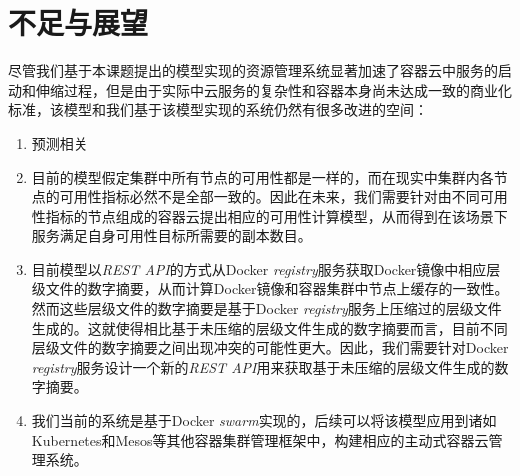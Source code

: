 \section{不足与展望}
尽管我们基于本课题提出的模型实现的资源管理系统显著加速了容器云中服务的启动和伸缩过程，但是由于实际中云服务的复杂性和容器本身尚未达成一致的商业化标准，该模型和我们基于该模型实现的系统仍然有很多改进的空间：
\begin{enumerate}
\item 预测相关
\item 目前的模型假定集群中所有节点的可用性都是一样的，而在现实中集群内各节点的可用性指标必然不是全部一致的。因此在未来，我们需要针对由不同可用性指标的节点组成的容器云提出相应的可用性计算模型，从而得到在该场景下服务满足自身可用性目标所需要的副本数目。
\item 目前模型以\emph{REST API}的方式从Docker \emph{registry}服务获取Docker镜像中相应层级文件的数字摘要，从而计算Docker镜像和容器集群中节点上缓存的一致性。然而这些层级文件的数字摘要是基于Docker \emph{registry}服务上压缩过的层级文件生成的。这就使得相比基于未压缩的层级文件生成的数字摘要而言，目前不同层级文件的数字摘要之间出现冲突的可能性更大。因此，我们需要针对Docker \emph{registry}服务设计一个新的\emph{REST API}用来获取基于未压缩的层级文件生成的数字摘要。
\item 我们当前的系统是基于Docker \emph{swarm}实现的，后续可以将该模型应用到诸如Kubernetes和Mesos等其他容器集群管理框架中，构建相应的主动式容器云管理系统。
\end{enumerate}
